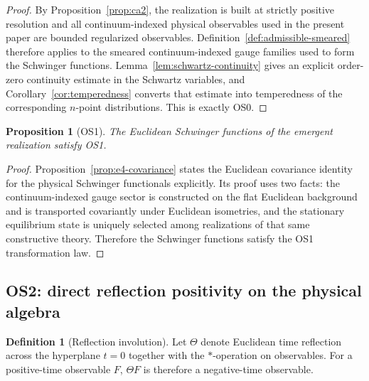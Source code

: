\documentclass[11pt]{article}
\newtheorem{proposition}[theorem]{Proposition}
\theoremstyle{definition}
\newtheorem{definition}[theorem]{Definition}
\theoremstyle{remark}
\begin{document}
\begin{proof}
By Proposition~\ref{prop:ca2}, the realization is built at strictly positive
resolution and all continuum-indexed physical observables used in the present
paper are bounded regularized observables.  Definition~\ref{def:admissible-smeared}
therefore applies to the smeared continuum-indexed gauge families used to form
the Schwinger functions.  Lemma~\ref{lem:schwartz-continuity} gives an explicit
order-zero continuity estimate in the Schwartz variables, and
Corollary~\ref{cor:temperedness} converts that estimate into temperedness of the
corresponding \(n\)-point distributions.  This is exactly OS0.
\end{proof}

\begin{proposition}[OS1]
\label{prop:os1}
The Euclidean Schwinger functions of the emergent realization satisfy OS1.
\end{proposition}

\begin{proof}
Proposition~\ref{prop:e4-covariance} states the Euclidean covariance identity
for the physical Schwinger functionals explicitly.  Its proof uses two facts:
the continuum-indexed gauge sector is constructed on the flat Euclidean
background and is transported covariantly under Euclidean isometries, and the
stationary equilibrium state is uniquely selected among realizations of that
same constructive theory.  Therefore the Schwinger functions satisfy the OS1
transformation law.
\end{proof}

\subsection{OS2: direct reflection positivity on the physical algebra}

\begin{definition}[Reflection involution]
\label{def:reflection}
Let $\Theta$ denote Euclidean time reflection across the hyperplane $t=0$
together with the $*$-operation on observables.
For a positive-time observable $F$, $\Theta F$ is therefore a negative-time
observable.
\end{definition}
\end{document}

